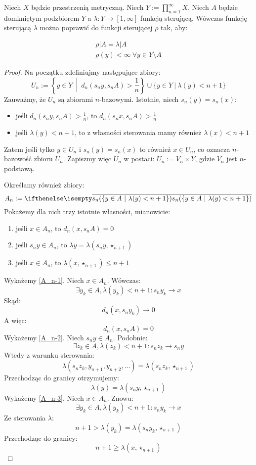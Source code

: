 \begin{thm}
\label{thm:steering-function}
Niech $X$ będzie przestrzenią metryczną. Niech $Y := \prod_{n=1}^\infty X$. Niech $A$ będzie domkniętym podzbiorem $Y$ a $\lambda: Y \rightarrow [1,\infty]$ funkcją sterującą. Wówczas funkcję sterującą $\lambda$ można poprawić do funkcji sterującej $\rho$ tak, aby:

\begin{gather*}
 \rho|A = \lambda|A \\
 \rho(y) < \infty\ \forall y \in Y \setminus A
\end{gather*}

\begin{proof}
  Na początku zdefiniujmy następujące zbiory:
  \[
    U_n := \left\{y \in Y\ \middle|\ d_n(s_n y, s_n A) > \frac{1}{n}\right\} \cup \{y \in Y\ |\ \lambda(y) < n+1\}
  \]
  Zauważmy, że $U_n$ są zbiorami $n$-bazowymi. Istotnie, niech $s_n(y) = s_n(x)$:
  \begin{itemize}
    \item jeśli $d_n(s_n y, s_n A) > \frac{1}{n}$, to $d_n(s_n x, s_n A) > \frac{1}{n}$
    \item jeśli $\lambda(y) < n+1$, to z własności sterowania mamy również $\lambda(x) < n+1$
  \end{itemize}
  Zatem jeśli tylko $y \in U_n$ i $s_n(y) = s_n(x)$ to również $x \in U_n$, co oznacza $n$-bazowość zbioru $U_n$. Zapiszmy więc $U_n$ w postaci: $U_n := V_n \times Y$, gdzie $V_n$ jest $n$-podstawą.
  
  Określamy również zbiory:
  \[
    A_n := \cl{s_n({\{y \in A\ |\ \lambda(y) < n+1\}})}
  \]
  Pokażemy dla nich trzy istotnie własności, mianowicie:
  \begin{enumerate}[(1)]
    \item \label{A_n-1} jeśli $x \in A_n$, to $d_n(x, s_n A) = 0$
    \item \label{A_n-2} jeśli $s_n y \in A_n$, to $\lambda y = \lambda(s_n y,\star_{n+1})$
    \item \label{A_n-3} jeśli $x \in A_n$, to $\lambda(x,\star_{n+1}) \leq n+1$
  \end{enumerate}
  Wykażemy \ref{A_n-1}. Niech $x \in A_n$. Wówczas:
  \[
    \exists y_k \in A, \lambda(y_k) < n+1: s_n y_k \to x
  \]
  Skąd:
  \[
    d_n(x, s_n y_k) \to 0
  \]
  A więc:
  \[
    d_n(x, s_n A) = 0
  \]
  Wykażemy \ref{A_n-2}. Niech $s_n y \in A_n$. Podobnie:
  \[
    \exists z_k \in A, \lambda(z_k) < n+1: s_n z_k \to s_n y
  \]
  Wtedy z warunku sterowania:
  \[
    \lambda(s_n z_k, y_{n+1}, y_{n+2}, \ldots) = \lambda(s_n z_k,\star_{n+1})
  \]
  Przechodząc do granicy otrzymujemy:
  \[
    \lambda(y) = \lambda(s_n y,\star_{n+1})
  \]
  Wykażemy \ref{A_n-3}. Niech $x \in A_n$. Znowu:
  \[
    \exists y_k \in A, \lambda(y_k) < n+1: s_n y_k \to x
  \]
  Ze sterowania $\lambda$:
  \[
    n+1 > \lambda(y_k) = \lambda(s_n y_k, \star_{n+1})
  \]
  Przechodząc do granicy:
  \[
    n+1 \geq \lambda(x, \star_{n+1})
  \]
  

\end{proof}
\end{thm}
